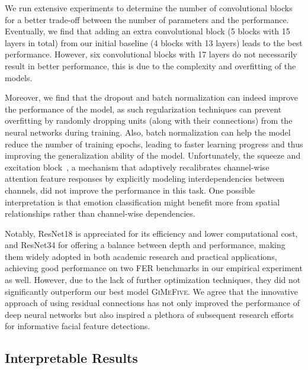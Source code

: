 We run extensive experiments to determine the number of convolutional blocks for a better trade-off between the number of parameters and the performance. 
Eventually, we find that adding an extra convolutional block 
(5 blocks with 15 layers in total) from our initial baseline (4 blocks with 13 layers)
leads to the best performance. 
However, six convolutional blocks with 17 layers do not necessarily result in better performance, 
this is due to the complexity and overfitting of the models. 

Moreover, 
we find that the dropout and batch normalization can indeed improve the performance of the model, 
as such regularization techniques can prevent overfitting by randomly dropping units 
(along with their connections) from the neural networks during training. 
Also, 
batch normalization can help the model reduce the number of training epochs, 
leading to faster learning progress and thus improving the generalization ability of the model. 
Unfortunately, the squeeze and excitation block~\cite{HuSASW20}, 
a mechanism that adaptively recalibrates channel-wise attention feature responses by explicitly modeling interdependencies between channels, 
did not improve the performance in this task. 
One possible interpretation is that emotion classification might benefit more from spatial relationships rather than channel-wise dependencies. 

Notably, 
ResNet18 is appreciated for its efficiency and lower computational cost, 
and ResNet34 for offering a balance between depth and performance, 
making them widely adopted in both academic research and practical applications, 
achieving good performance on two FER benchmarks in our empirical experiment as well. 
However, due to the lack of further optimization techniques, 
they did not significantly outperform our best model \textsc{GiMeFive}. 
We agree that the innovative approach of using residual connections has not only improved the performance of deep neural networks 
but also inspired a plethora of subsequent research efforts for informative facial feature detections. 

\subsection{Interpretable Results}
\label{sec:evaluation:inter}

